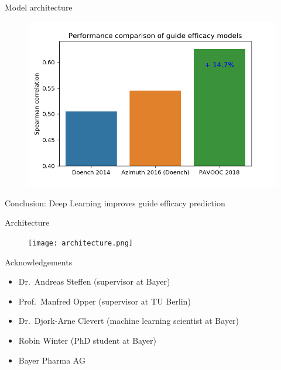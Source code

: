 \documentclass[Nike]{tuberlinbeamer}
\begin{document}
\begin{frame}{Model architecture}
  \begin{figure}
    \includegraphics[width=0.65\linewidth]{model_comparison2.png}
  \end{figure}

  Conclusion: Deep Learning improves guide efficacy prediction
\end{frame}

\begin{frame}{Architecture}
  \begin{figure}
    \centering
    \texttt{[image: architecture.png]}
  \end{figure}
\end{frame}

\begin{frame}{Acknowledgements}
  \begin{itemize}
    \item Dr.\ Andreas Steffen (supervisor at Bayer)
    \item Prof.\ Manfred Opper (supervisor at TU Berlin)
    \item Dr.\ Djork-Arne Clevert (machine learning scientist at Bayer)
    \item Robin Winter (PhD student at Bayer)
    \item Bayer Pharma AG
  \end{itemize}

\end{frame}
\end{document}
